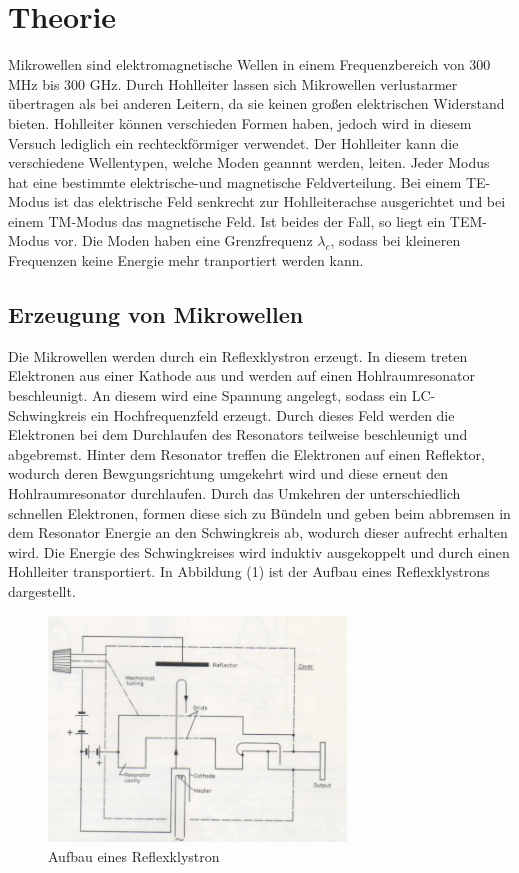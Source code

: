 \section{Theorie}
\label{sec:Theorie}
Mikrowellen sind elektromagnetische Wellen in einem Frequenzbereich von $300$ MHz bis 300 GHz. Durch
Hohlleiter lassen sich Mikrowellen verlustarmer übertragen als bei anderen Leitern, da
sie keinen großen elektrischen Widerstand bieten. Hohlleiter können verschieden Formen haben,
jedoch wird in diesem Versuch lediglich ein rechteckförmiger verwendet. Der Hohlleiter
kann die verschiedene Wellentypen, welche Moden geannnt werden, leiten. Jeder Modus hat
eine bestimmte elektrische-und magnetische Feldverteilung. Bei einem TE-Modus ist das elektrische
Feld senkrecht zur Hohlleiterachse ausgerichtet und bei einem TM-Modus das magnetische Feld.
Ist beides der Fall, so liegt ein TEM-Modus vor. Die Moden haben eine Grenzfrequenz $\lambda_c$, sodass
bei kleineren Frequenzen keine Energie mehr tranportiert werden kann.

\subsection{Erzeugung von Mikrowellen}
Die Mikrowellen werden durch ein Reflexklystron erzeugt. In diesem treten Elektronen
aus einer Kathode aus und werden auf einen Hohlraumresonator beschleunigt. An diesem
wird eine Spannung angelegt, sodass ein LC-Schwingkreis ein Hochfrequenzfeld erzeugt.
Durch dieses Feld werden die Elektronen  bei dem Durchlaufen des Resonators teilweise beschleunigt und abgebremst.
Hinter dem Resonator treffen die Elektronen auf einen Reflektor, wodurch deren
Bewgungsrichtung umgekehrt wird und diese erneut den Hohlraumresonator durchlaufen.
Durch das Umkehren der unterschiedlich schnellen Elektronen, formen diese sich zu Bündeln und
geben beim abbremsen in dem Resonator Energie an den Schwingkreis ab, wodurch dieser
aufrecht erhalten wird. Die Energie des Schwingkreises wird induktiv ausgekoppelt und
durch einen Hohlleiter transportiert. In Abbildung (1) ist der Aufbau
eines Reflexklystrons dargestellt.

\begin{figure}[H]
  \centering
  \includegraphics[height=6cm]{klystron.PNG}
  \caption{Aufbau eines Reflexklystron \cite{sample}}
  \label{fig:Lock}
\end{figure}

